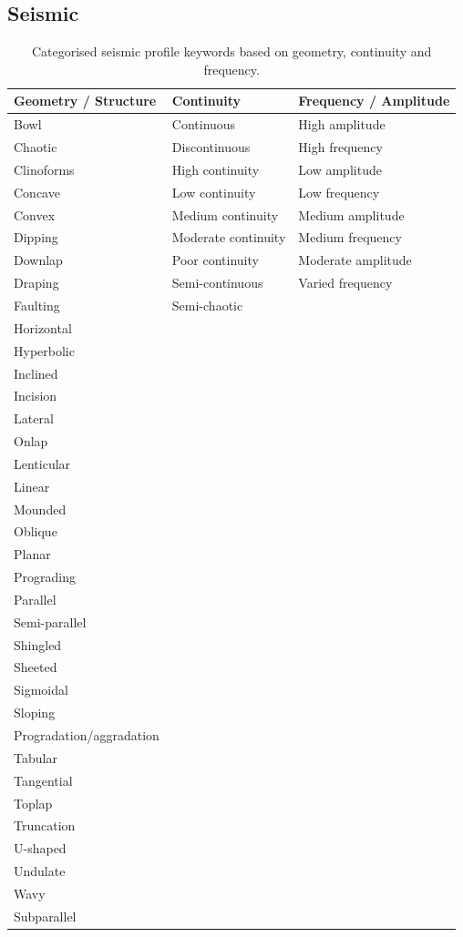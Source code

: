 \clearpage
\subsection{Seismic}
\begin{table}[h!]
\centering
\caption{Categorised seismic profile keywords based on geometry, continuity and frequency.}
\begin{tabular}{|p{4.5cm}|p{4.5cm}|p{4.5cm}|}
\hline
\textbf{Geometry / Structure} & \textbf{Continuity} & \textbf{Frequency / Amplitude} \\
\hline
Bowl & Continuous & High amplitude \\
Chaotic & Discontinuous & High frequency \\
Clinoforms & High continuity & Low amplitude \\
Concave & Low continuity & Low frequency \\
Convex & Medium continuity & Medium amplitude \\
Dipping & Moderate continuity & Medium frequency \\
Downlap & Poor continuity & Moderate amplitude \\
Draping & Semi-continuous & Varied frequency \\
Faulting & Semi-chaotic & \\
Horizontal & & \\
Hyperbolic & & \\
Inclined & & \\
Incision & & \\
Lateral & & \\
Onlap & & \\
Lenticular & & \\
Linear & & \\
Mounded & & \\
Oblique & & \\
Planar & & \\
Prograding & & \\
Parallel & & \\
Semi-parallel & & \\
Shingled & & \\
Sheeted & & \\
Sigmoidal & & \\
Sloping & & \\
Progradation/aggradation & & \\
Tabular & & \\
Tangential & & \\
Toplap & & \\
Truncation & & \\
U-shaped & & \\
Undulate & & \\
Wavy & & \\
Subparallel & & \\
\hline
\end{tabular}
\label{tab:separated_keywords}
\end{table}

